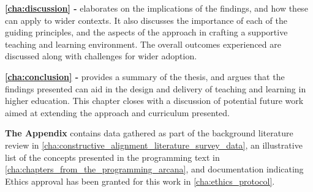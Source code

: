 

\textbf{\cref{cha:discussion} - } elaborates on the implications of the findings, and how these can apply to wider contexts. It also discusses the importance of each of the guiding principles, and the aspects of the approach in crafting a supportive teaching and learning environment. The overall outcomes experienced are discussed along with challenges for wider adoption. 

\textbf{\cref{cha:conclusion} - } provides a summary of the thesis, and argues that the findings presented can aid in the design and delivery of teaching and learning in higher education. This chapter closes with a discussion of potential future work aimed at extending the approach and curriculum presented.

\textbf{The Appendix} contains data gathered as part of the background literature review in \cref{cha:constructive_alignment_literature_survey_data}, an illustrative list of the concepts presented in the programming text in \cref{cha:chapters_from_the_programming_arcana}, and documentation indicating Ethics approval has been granted for this work in \cref{cha:ethics_protocol}.




